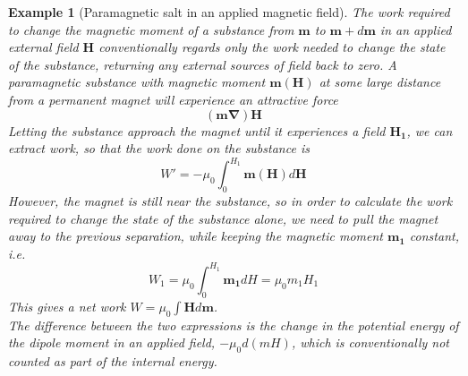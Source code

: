 \documentclass[a4paper]{article}
\newtheorem{eg}{Example}[section]
\theoremstyle{new}
\begin{document}
\begin{eg}[Paramagnetic salt in an applied magnetic field]
The work required to change the magnetic moment of a substance from $\mathbf{m}$ to $\mathbf{m}+d\mathbf{m}$ in an applied external field $\mathbf{H}$ conventionally regards only the work needed to change the state of the substance, returning any external sources of field back to zero. A paramagnetic substance with magnetic moment $\mathbf{m}(\mathbf{H})$ at some large distance from a permanent magnet will experience an attractive force
$$(\mathbf{m}\boldsymbol{\nabla})\mathbf{H}$$
Letting the substance approach the magnet until it experiences a field $\mathbf{H_1}$, we can extract work, so that the work done on the substance is
$$W'=-\mu_0\int_0^{H_1}\mathbf{m}(\mathbf{H})d\mathbf{H}$$
However, the magnet is still near the substance, so in order to calculate the work required to change the state of the substance alone, we need to pull the magnet away to the previous separation, while keeping the magnetic moment $\mathbf{m_1}$ constant, i.e.
$$W_1=\mu_0\int_0^{H_1}\mathbf{m_1}dH=\mu_0m_1H_1$$
This gives a net work $W=\mu_0\int\mathbf{H} d\mathbf{m}$.\\[5pt]
The difference between the two expressions is the change in the potential energy of the dipole moment in an applied field, $-\mu_0d(mH)$, which is conventionally not counted as part of the internal energy. 
\end{eg}
\newpage
\end{document}
